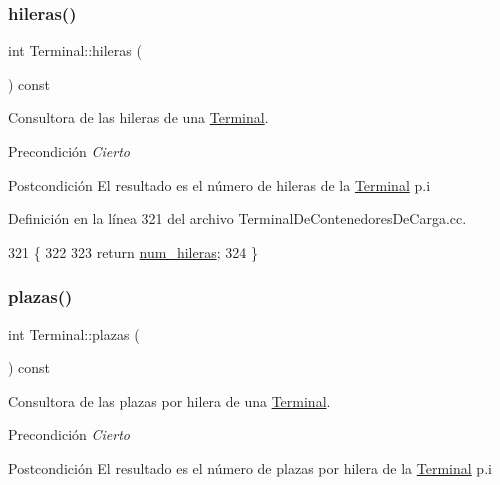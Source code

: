 \subsubsection{\texorpdfstring{hileras()}{hileras()}}
{\footnotesize\ttfamily int Terminal\+::hileras (\begin{DoxyParamCaption}{ }\end{DoxyParamCaption}) const}



Consultora de las hileras de una \hyperlink{class_terminal}{Terminal}. 

\begin{DoxyPrecond}{Precondición}
{\itshape Cierto} 
\end{DoxyPrecond}
\begin{DoxyPostcond}{Postcondición}
El resultado es el número de hileras de la \hyperlink{class_terminal}{Terminal} p.\+i 
\end{DoxyPostcond}


Definición en la línea 321 del archivo Terminal\+De\+Contenedores\+De\+Carga.\+cc.


\begin{DoxyCode}
321                             \{
322     
323     \textcolor{keywordflow}{return} \hyperlink{class_terminal_a865c963b18aa837549dd637d439e8502}{num\_hileras};
324 \}
\end{DoxyCode}
\mbox{\label{class_terminal_a06602e79ec9e7bca40d73d7a6c436fe3}} 
\subsubsection{\texorpdfstring{plazas()}{plazas()}}
{\footnotesize\ttfamily int Terminal\+::plazas (\begin{DoxyParamCaption}{ }\end{DoxyParamCaption}) const}



Consultora de las plazas por hilera de una \hyperlink{class_terminal}{Terminal}. 

\begin{DoxyPrecond}{Precondición}
{\itshape Cierto} 
\end{DoxyPrecond}
\begin{DoxyPostcond}{Postcondición}
El resultado es el número de plazas por hilera de la \hyperlink{class_terminal}{Terminal} p.\+i 
\end{DoxyPostcond}


